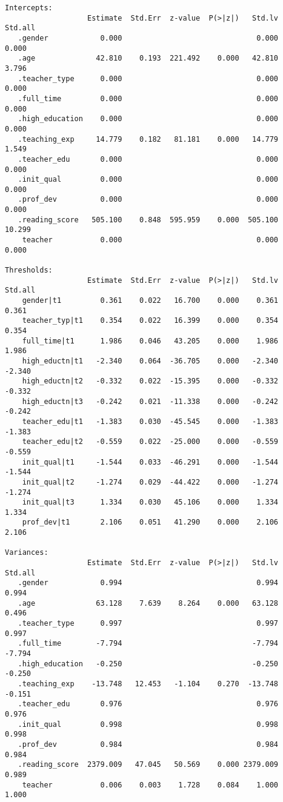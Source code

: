 \documentclass[
]{article}
\begin{document}
\begin{verbatim}
Intercepts:
                   Estimate  Std.Err  z-value  P(>|z|)   Std.lv  Std.all
   .gender            0.000                               0.000    0.000
   .age              42.810    0.193  221.492    0.000   42.810    3.796
   .teacher_type      0.000                               0.000    0.000
   .full_time         0.000                               0.000    0.000
   .high_education    0.000                               0.000    0.000
   .teaching_exp     14.779    0.182   81.181    0.000   14.779    1.549
   .teacher_edu       0.000                               0.000    0.000
   .init_qual         0.000                               0.000    0.000
   .prof_dev          0.000                               0.000    0.000
   .reading_score   505.100    0.848  595.959    0.000  505.100   10.299
    teacher           0.000                               0.000    0.000

Thresholds:
                   Estimate  Std.Err  z-value  P(>|z|)   Std.lv  Std.all
    gender|t1         0.361    0.022   16.700    0.000    0.361    0.361
    teacher_typ|t1    0.354    0.022   16.399    0.000    0.354    0.354
    full_time|t1      1.986    0.046   43.205    0.000    1.986    1.986
    high_eductn|t1   -2.340    0.064  -36.705    0.000   -2.340   -2.340
    high_eductn|t2   -0.332    0.022  -15.395    0.000   -0.332   -0.332
    high_eductn|t3   -0.242    0.021  -11.338    0.000   -0.242   -0.242
    teacher_edu|t1   -1.383    0.030  -45.545    0.000   -1.383   -1.383
    teacher_edu|t2   -0.559    0.022  -25.000    0.000   -0.559   -0.559
    init_qual|t1     -1.544    0.033  -46.291    0.000   -1.544   -1.544
    init_qual|t2     -1.274    0.029  -44.422    0.000   -1.274   -1.274
    init_qual|t3      1.334    0.030   45.106    0.000    1.334    1.334
    prof_dev|t1       2.106    0.051   41.290    0.000    2.106    2.106

Variances:
                   Estimate  Std.Err  z-value  P(>|z|)   Std.lv  Std.all
   .gender            0.994                               0.994    0.994
   .age              63.128    7.639    8.264    0.000   63.128    0.496
   .teacher_type      0.997                               0.997    0.997
   .full_time        -7.794                              -7.794   -7.794
   .high_education   -0.250                              -0.250   -0.250
   .teaching_exp    -13.748   12.453   -1.104    0.270  -13.748   -0.151
   .teacher_edu       0.976                               0.976    0.976
   .init_qual         0.998                               0.998    0.998
   .prof_dev          0.984                               0.984    0.984
   .reading_score  2379.009   47.045   50.569    0.000 2379.009    0.989
    teacher           0.006    0.003    1.728    0.084    1.000    1.000


\end{verbatim}
\end{document}
